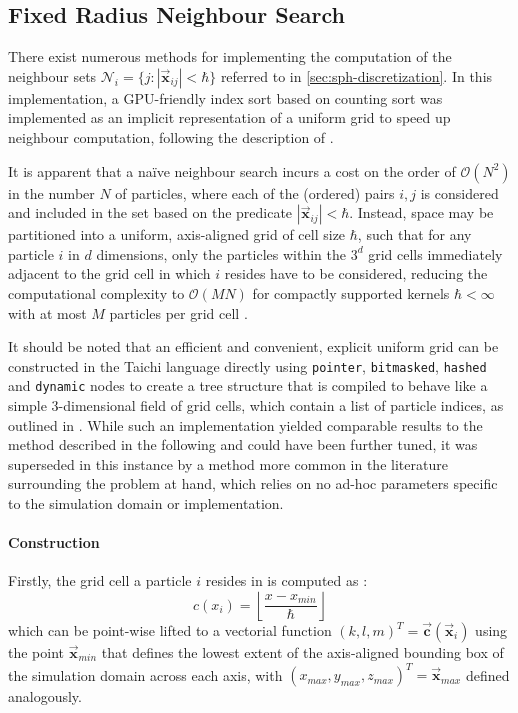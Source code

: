 \documentclass[oneside, a4paper]{book}
\newcommand\abs[1]{\left|#1\right|}
\newcommand\vek[1]{\vec{\bm{#1}}}
\newcommand\br[1]{\left(#1\right)}
\begin{document}
\begin{appendices}
    \chapter{Fixed Radius Neighbour Search}
    There exist numerous methods for implementing the computation of the neighbour sets $\mathcal{N}_i = \{j : \abs{\vek{x}_{ij}}<\hbar\}$ referred to in \autoref{sec:sph-discretization}. In this implementation, a GPU-friendly index sort based on counting sort was implemented as an implicit representation of a uniform grid to speed up neighbour computation, following the description of \autocite[Hoetzlein]{hoetzlein-rama-counting-sort}. 

    It is apparent that a na\"ive neighbour search incurs a cost on the order of $\mathcal{O}\br{N^2}$ in the number $N$ of particles, where each of the (ordered) pairs $i,j$ is considered and included in the set based on the predicate $\abs{\vek{x}_{ij}}<\hbar$. Instead, space may be partitioned into a uniform, axis-aligned grid of cell size $\hbar$, such that for any particle $i$ in $d$ dimensions, only the particles within the $3^d$ grid cells immediately adjacent to the grid cell in which $i$ resides have to be considered, reducing the computational complexity to $\mathcal{O}(MN)$ for compactly supported kernels $\hbar<\infty$ with at most $M$ particles per grid cell \autocite{tutorial2019}. 
    
    It should be noted that an efficient and convenient, explicit uniform grid can be constructed in the Taichi language directly using \texttt{pointer}, \texttt{bitmasked}, \texttt{hashed} and \texttt{dynamic} nodes to create a tree structure that is compiled to behave like a simple 3-dimensional field of grid cells, which contain a list of particle indices, as outlined in \cite[this paper]{taichi-sparse}. While such an implementation yielded comparable results to the method described in the following and could have been further tuned, it was superseded in this instance by a method more common in the literature surrounding the problem at hand, which relies on no ad-hoc parameters specific to the simulation domain or implementation.

    \subsubsection{Construction}
    Firstly,  the grid cell a particle $i$ resides in is computed as \autocite{compressed-neighbour-lists}:
    \begin{equation}
      c(x_i) =  \left\lfloor\frac{x-x_{min}}{\hbar}\right\rfloor
    \end{equation}
    which can be point-wise lifted to a vectorial function $(k,l,m)^T = \vek{c}\br{\vek{x}_i}$ using the point $\vek{x}_{min}$ that defines the lowest extent of the axis-aligned bounding box of the simulation domain across each axis, with $(x_{max}, y_{max}, z_{max})^T = \vek{x}_{max}$ defined analogously. 
    

\end{appendices}
\end{document}
